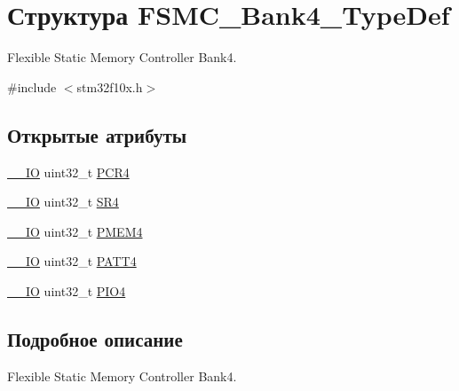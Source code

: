 \hypertarget{struct_f_s_m_c___bank4___type_def}{}\section{Структура F\+S\+M\+C\+\_\+\+Bank4\+\_\+\+Type\+Def}
\label{struct_f_s_m_c___bank4___type_def}


Flexible Static Memory Controller Bank4.  




{\ttfamily \#include $<$stm32f10x.\+h$>$}

\subsection*{Открытые атрибуты}
\begin{DoxyCompactItemize}
\item 
\mbox{\hyperlink{group___c_m_s_i_s___c_m3__core__definitions_gaec43007d9998a0a0e01faede4133d6be}{\+\_\+\+\_\+\+IO}} uint32\+\_\+t \mbox{\hyperlink{struct_f_s_m_c___bank4___type_def_a0470b5bbb53e9f1bbde09829371eb72f}{P\+C\+R4}}
\item 
\mbox{\hyperlink{group___c_m_s_i_s___c_m3__core__definitions_gaec43007d9998a0a0e01faede4133d6be}{\+\_\+\+\_\+\+IO}} uint32\+\_\+t \mbox{\hyperlink{struct_f_s_m_c___bank4___type_def_a1e0f09be7fa48bb7b14233866da1dd9f}{S\+R4}}
\item 
\mbox{\hyperlink{group___c_m_s_i_s___c_m3__core__definitions_gaec43007d9998a0a0e01faede4133d6be}{\+\_\+\+\_\+\+IO}} uint32\+\_\+t \mbox{\hyperlink{struct_f_s_m_c___bank4___type_def_a4ed4ce751e7a8b3207bd20675b1d9085}{P\+M\+E\+M4}}
\item 
\mbox{\hyperlink{group___c_m_s_i_s___c_m3__core__definitions_gaec43007d9998a0a0e01faede4133d6be}{\+\_\+\+\_\+\+IO}} uint32\+\_\+t \mbox{\hyperlink{struct_f_s_m_c___bank4___type_def_a4cccc7802b573135311cc38e7f247ff5}{P\+A\+T\+T4}}
\item 
\mbox{\hyperlink{group___c_m_s_i_s___c_m3__core__definitions_gaec43007d9998a0a0e01faede4133d6be}{\+\_\+\+\_\+\+IO}} uint32\+\_\+t \mbox{\hyperlink{struct_f_s_m_c___bank4___type_def_a531ebc38c47bebfb198eafb4de24cb2a}{P\+I\+O4}}
\end{DoxyCompactItemize}


\subsection{Подробное описание}
Flexible Static Memory Controller Bank4. 

